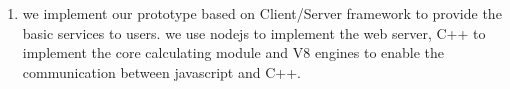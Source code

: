 \begin{englishabstract}
\begin{enumerate}
    \item we implement our prototype based on Client/Server framework to provide the basic services to users. we use nodejs to implement the web server, C++ to implement the core calculating module and V8 engines to enable the communication between javascript and C++.
\end{enumerate}

\end{englishabstract}
